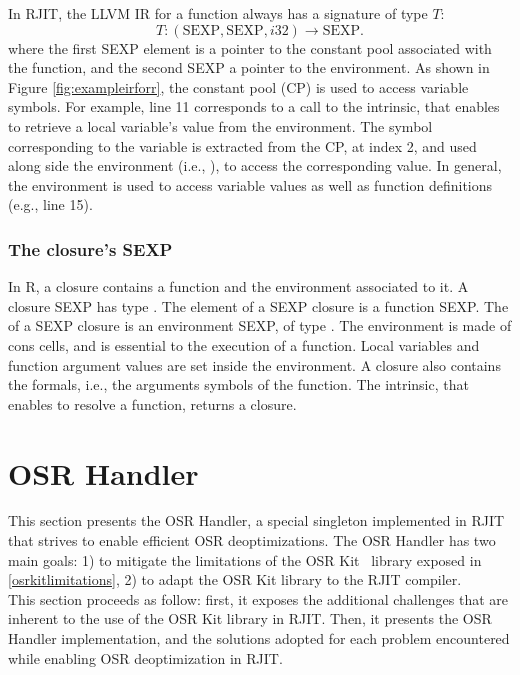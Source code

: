 In RJIT, the LLVM IR for a function always has a signature of type $T$:
$$T: (\text{SEXP}, \text{SEXP}, i32) \rightarrow \text{SEXP}.$$
where the first SEXP element is a pointer to the constant pool associated with the function, and the second SEXP a pointer to the environment.
As shown in Figure \ref{fig:exampleirforr}, the constant pool (CP) is used to access variable symbols. 
For example, line 11 corresponds to a call to the  intrinsic, that enables to retrieve a local variable's value from the environment.
The symbol corresponding to the variable is extracted from the CP, at index 2, and used along side the environment (i.e., ), to access the corresponding value.
In general, the environment is used to access variable values as well as function definitions (e.g., line 15).\\


\subsubsection{The closure's SEXP}
In R, a closure contains a function and the environment associated to it.
A closure SEXP has type .
The  element of a SEXP closure is a function SEXP.
The  of a SEXP closure is an environment SEXP, of type .
The environment is made of cons cells, and is essential to the execution of a function.
Local variables and function argument values are set inside the environment.
A closure also contains the formals, i.e., the arguments symbols of the function.
The  intrinsic, that enables to resolve a function, returns a closure.\\


\section{OSR Handler}
This section presents the OSR Handler, a special singleton implemented in RJIT that strives to enable efficient OSR deoptimizations. 
The OSR Handler has two main goals: 1) to mitigate the limitations of the OSR Kit~\cite{OSRKit} library exposed in \ref{osrkitlimitations}, 2) to adapt the OSR Kit library to the RJIT compiler.\\

This section proceeds as follow: first, it exposes the additional challenges that are inherent to the use of the OSR Kit library in RJIT.
Then, it presents the OSR Handler implementation, and the solutions adopted for each problem encountered while enabling OSR deoptimization in RJIT.\\
 
